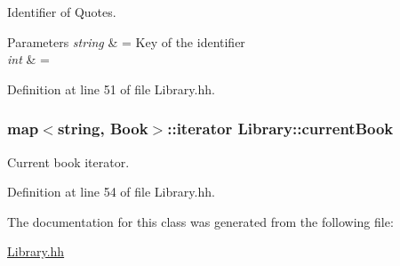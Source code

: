 Identifier of Quotes. 


\begin{DoxyParams}{Parameters}
{\em string} & = Key of the identifier \\
\hline
{\em int} & = \\
\hline
\end{DoxyParams}


Definition at line 51 of file Library.\-hh.

\hypertarget{class_library_a78a4071e8d610da671b3886c71900dae}{
\subsubsection[{current\-Book}]{\setlength{\rightskip}{0pt plus 5cm}map$<$string, {\bf Book}$>$\-::iterator Library\-::current\-Book\hspace{0.3cm}{\ttfamily [private]}}}\label{class_library_a78a4071e8d610da671b3886c71900dae}


Current book iterator. 



Definition at line 54 of file Library.\-hh.



The documentation for this class was generated from the following file\-:\begin{DoxyCompactItemize}
\item 
\hyperlink{_library_8hh}{Library.\-hh}\end{DoxyCompactItemize}
